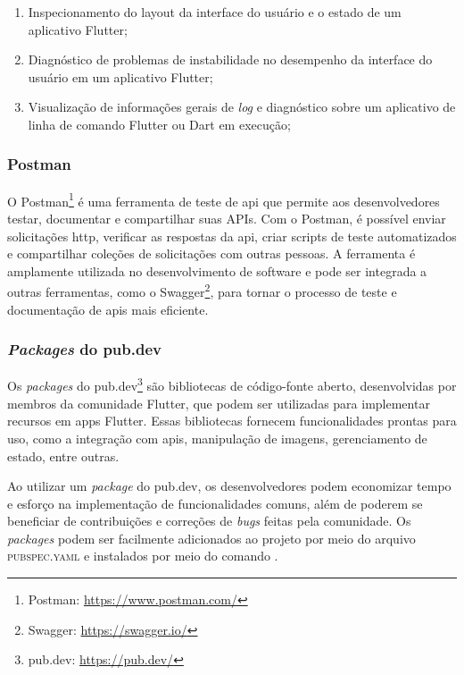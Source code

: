  \begin{enumerate}
   \item Inspecionamento do layout da interface do usuário e o estado de um aplicativo Flutter;
   \item Diagnóstico de problemas de instabilidade no desempenho da interface do usuário em um aplicativo Flutter;
   \item Visualização de informações gerais de \textit{log} e diagnóstico sobre um aplicativo de linha de comando Flutter ou Dart em execução;
 \end{enumerate}

\subsubsection{Postman}\label{sssec:postman}
O Postman\footnote{\label{postman}Postman: \url{https://www.postman.com/}} é uma ferramenta de teste de \ac{api} que permite aos desenvolvedores testar, documentar e compartilhar suas APIs. Com o Postman, é possível enviar solicitações \ac{http}, verificar as respostas da \ac{api}, criar scripts de teste automatizados e compartilhar coleções de solicitações com outras pessoas. A ferramenta é amplamente utilizada no desenvolvimento de software e pode ser integrada a outras ferramentas, como o Swagger\footnote{\label{swagger}Swagger: \url{https://swagger.io/}}, para tornar o processo de teste e documentação de \acp{api} mais eficiente.

\subsubsection{\textit{Packages} do pub.dev}\label{sssec:pubdev}
Os \textit{packages} do pub.dev\footnote{\label{pubdev}pub.dev: \url{https://pub.dev/}} são bibliotecas de código-fonte aberto, desenvolvidas por membros da comunidade Flutter, que podem ser utilizadas para implementar recursos em \acp{app} Flutter. Essas bibliotecas fornecem funcionalidades prontas para uso, como a integração com \acp{api}, manipulação de imagens, gerenciamento de estado, entre outras. 

Ao utilizar um \textit{package} do pub.dev, os desenvolvedores podem economizar tempo e esforço na implementação de funcionalidades comuns, além de poderem se beneficiar de contribuições e correções de \textit{bugs} feitas pela comunidade. Os \textit{packages} podem ser facilmente adicionados ao projeto por meio do arquivo \textsc{pubspec.yaml} e instalados por meio do comando .

